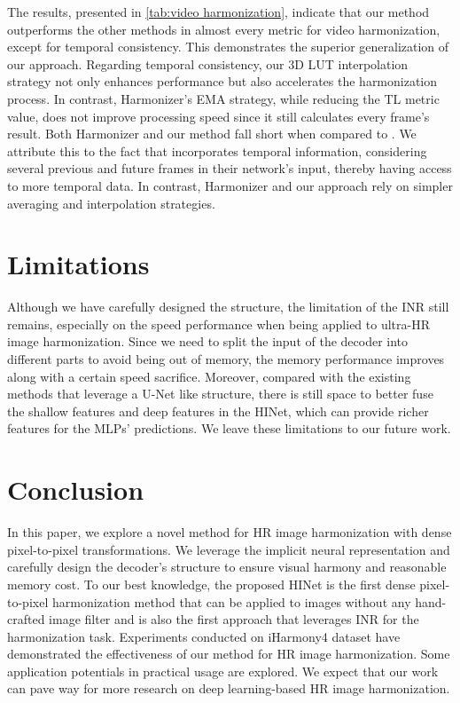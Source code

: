 \documentclass[10pt,journal,twocolumn,twoside]{IEEEtran}
\begin{document}
The results, presented in \cref{tab:video harmonization}, indicate that our method outperforms the other methods in almost every metric for video harmonization, except for temporal consistency. This demonstrates the superior generalization of our approach. Regarding temporal consistency, our 3D LUT interpolation strategy not only enhances performance but also accelerates the harmonization process. In contrast, Harmonizer's EMA strategy, while reducing the TL metric value, does not improve processing speed since it still calculates every frame's result. Both Harmonizer and our method fall short when compared to \cite{hyoutube2021}. We attribute this to the fact that \cite{hyoutube2021} incorporates temporal information, considering several previous and future frames in their network's input, thereby having access to more temporal data. In contrast, Harmonizer and our approach rely on simpler averaging and interpolation strategies.



\section{Limitations}
\label{sec:Limitations}

Although we have carefully designed the structure, the limitation of the INR still remains, especially on the speed performance when being applied to ultra-HR image harmonization. Since we need to split the input of the decoder into different parts to avoid being out of memory, the memory performance improves along with a certain speed sacrifice. Moreover, compared with the existing methods that leverage a U-Net like structure, there is still space to better fuse the shallow features and deep features in the HINet, which can provide richer features for the MLPs' predictions. We leave these limitations to our future work.


\section{Conclusion}
\label{sec:conclusion}

In this paper, we explore a novel method for HR image harmonization with dense pixel-to-pixel transformations. We leverage the implicit neural representation and carefully design the decoder's structure to ensure visual harmony and reasonable memory cost. To our best knowledge, the proposed HINet is the first dense pixel-to-pixel harmonization method that can be applied to images  without any hand-crafted image filter and is also the first approach that leverages INR for the harmonization task. Experiments conducted on iHarmony4 dataset have demonstrated the effectiveness of our method for HR image harmonization. Some application potentials in practical usage are explored. We expect that our work can pave way for more research on deep learning-based HR image harmonization.





\normalem
  

\end{document}
